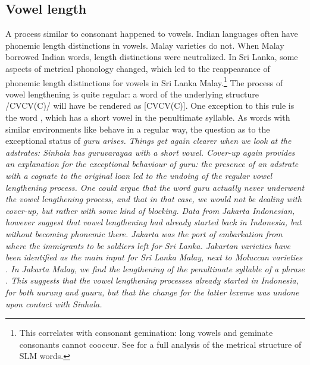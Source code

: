 \documentclass[a4paper,10pt]{article}
\begin{document}
\subsection{Vowel length} 
A process similar to consonant happened to vowels. Indian languages often have phonemic length distinctions in vowels. Malay varieties do not. When Malay borrowed Indian words, length distinctions were neutralized. In Sri Lanka, some aspects of metrical phonology changed, which led to the reappearance of phonemic length distinctions for vowels in Sri Lanka Malay.\footnote{This
 correlates with consonant gemination: long vowels and geminate consonants cannot cooccur. See \citet{Nordhoff2009phd} for a full analysis of the metrical structure of SLM words.
}
The process of vowel lengthening is quite regular: a word of the underlying structure /CVCV(C)/ will have be rendered as [CV\textipa{:}CV(C)]. One exception to this rule is the word , which has a short vowel in the penultimate syllable. As words with similar environments like  behave in a regular way, the question as to the exceptional status of \em guru \em arises. Things get again clearer when we look at the adstrates: Sinhala has \em guruvarayaa \em  with a short vowel. Cover-up again provides an explanation for the exceptional behaviour of \em guru\em: the presence of an adstrate with a cognate to the original loan led to the undoing of the regular vowel lengthening process. One could argue that the word \em guru \em actually never underwent the vowel lengthening process, and that in that case, we would not be dealing with cover-up, but rather with some kind of blocking. Data from Jakarta Indonesian, however suggest that vowel lengthening had already started back in Indonesia, but 
without becoming phonemic there. Jakarta was the port of embarkation from where the immigrants to be soldiers left for Sri Lanka. Jakartan varieties have been identified as the main input for Sri Lanka Malay, next to Moluccan varieties \citep{Paauw}. In Jakarta Malay, we find the lengthening of the penultimate syllable of a phrase \citep{abc}. This suggests that the vowel lengthening processes already started in Indonesia, for both \em {\dentt}uurung \em and \em guuru\em, but that the change for the latter lexeme was undone upon contact with Sinhala. 
\end{document}

